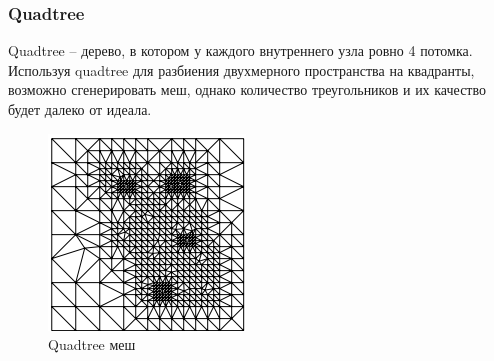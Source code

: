 \documentclass{fefu}
\begin{document}
\subsubsection{Quadtree}
Quadtree -- дерево, в котором у каждого внутреннего узла ровно 4 потомка. Используя quadtree для разбиения двухмерного
пространства на квадранты, возможно сгенерировать меш, однако количество треугольников и их качество будет далеко от идеала.
\begin{figure}[H]
    \centering
    \includegraphics{images/quadtree.png}
    \caption{Quadtree меш}
\end{figure}
\end{document}
